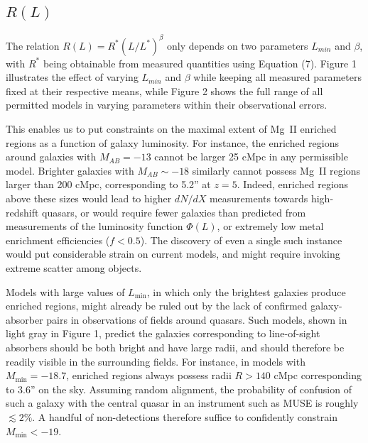\documentclass[useAMS,usenatbib]{mn2e}
\newcommand{\magtwo}{Mg~{\small II} }
\begin{document}
\subsection{$R(L)$}

The relation $R(L) = R^* (L/L^*)^\beta$ only depends on two parameters $L_{min}$ and $\beta$, with $R^*$ being obtainable from measured quantities using Equation (7). Figure 1 illustrates the effect of varying $L_{min}$ and $\beta$ while keeping all measured parameters fixed at their respective means, while Figure 2 shows the full range of all permitted models in varying parameters within their observational errors. 

This enables us to put constraints on the maximal extent of \magtwo enriched regions as a function of galaxy luminosity. For instance, the enriched regions around galaxies with $M_{AB} = -13$ cannot be larger 25 cMpc in any permissible model. Brighter galaxies with $M_{AB} \sim -18$ similarly cannot possess \magtwo regions larger than 200 cMpc, corresponding to 5.2'' at $z=5$. Indeed, enriched regions above these sizes would lead to higher $dN/dX$ measurements towards high-redshift quasars, or would require fewer galaxies than predicted from measurements of the luminosity function $\Phi(L)$, or extremely low metal enrichment efficiencies ($f<0.5$). The discovery of even a single such instance would put considerable strain on current models, and might require invoking extreme scatter among objects.

Models with large values of $L_\text{min}$, in which only the brightest galaxies produce enriched regions, might already be ruled out by the lack of confirmed galaxy-absorber pairs in observations of fields around quasars. Such models, shown in light gray in Figure 1, predict the galaxies corresponding to line-of-sight absorbers should be both bright and have large radii, and should therefore be readily visible in the surrounding fields. For instance, in models with $M_\text{min} = -18.7$, enriched regions always possess radii $R>140$ cMpc corresponding to 3.6'' on the sky. Assuming random alignment, the probability of confusion of such a galaxy with the central quasar in an instrument such as MUSE is roughly $\lesssim2\%$. A handful of non-detections therefore suffice to confidently constrain $M_\text{min} < -19$.

\end{document}
